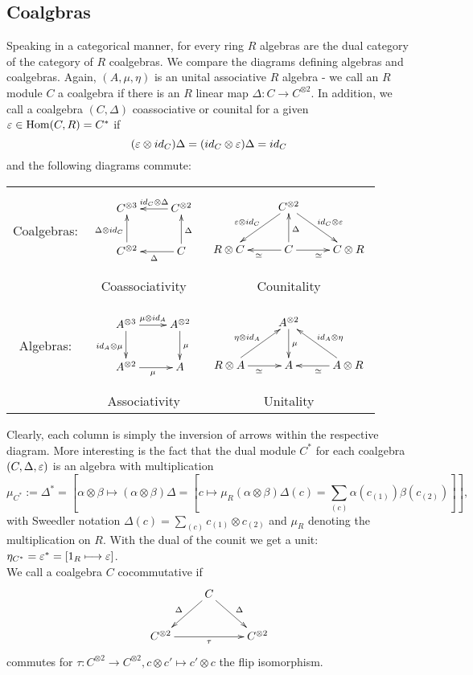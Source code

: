 \subsection{Coalgbras}
Speaking in a categorical manner, for every ring $R$ algebras are the dual category of the category of $R$ coalgebras. We compare the diagrams defining algebras and coalgebras. Again, $(A, \mu, \eta)$ is an unital associative $R$ algebra - we call an $R$ module $C$ a coalgebra if there is an $R$ linear map $\Delta : C \longrightarrow C^{\otimes2}$. In addition, we call a coalgebra $(C, \Delta)$ coassociative or counital for a given $\varepsilon \in \mathrm{Hom}(C,R) = C^\ast$ if 
$$(\varepsilon \otimes id_C) \Delta = (id_C \otimes \varepsilon) \Delta = id_C$$
and the following diagrams commute:
\begin{longtable}{|c|cc|}
\hline
Coalgebras: &$$
\xymatrix{
C^{\otimes 3}  & C^{\otimes 2}\ar[l]_{id_C \otimes \Delta}\\
C^{\otimes 2} \ar[u]^{\Delta \otimes id_C}&C\ar[l]^{\Delta} \ar[u]_{\Delta}\\
}$$
&$$
\xymatrix{
&C^{\otimes 2}\ar[ld]_{\eps \otimes id_C}\ar[rd]^{id_C \otimes \eps}&\\
R \otimes C  &C\ar[u]_\Delta\ar[r]_{\simeq}\ar[l]^\simeq&C \otimes R \\
}$$\\
&Coassociativity & Counitality\\
\hline
&&\\
Algebras: &$$
\xymatrix{
A^{\otimes 3} \ar[r]^{\mu \otimes id_A} \ar[d]_{id_A \otimes \mu} & A^{\otimes 2}\ar[d]^{\mu}\\
A^{\otimes 2} \ar[r]_{\mu} &A\\
}$$
&$$
\xymatrix{
&A^{\otimes 2}\ar[d]^\mu&\\
R \otimes A \ar[r]_{\simeq}\ar[ru]^{\eta \otimes id_A} &A&A \otimes R \ar[lu]_{id_A \otimes \eta}\ar[l]^\simeq\\
}$$\\
&Associativity & Unitality\\
\hline
\end{longtable}
Clearly, each column is simply the inversion of arrows within the respective diagram. More interesting is the fact that the dual module $C^\ast$ for each coalgebra $(C, \Delta, \varepsilon)$ is an algebra with multiplication
$$\mu_{C^\ast} := \Delta^\ast = \left[\alpha \otimes \beta \longmapsto (\alpha \otimes \beta) \Delta = \left[c \longmapsto \mu_R(\alpha \otimes \beta)\Delta(c) = \sum_{(c)} \alpha(c_{(1)}) \beta(c_{(2)})\right]\right],$$
with Sweedler notation $\Delta(c) = \sum_{(c)} c_{(1)} \otimes c_{(2)}$ and $\mu_R$ denoting the multiplication on $R$. With the dual of the counit we get a unit: $\eta_{C^\ast} = \varepsilon^\ast = [1_R \longmapsto \varepsilon]$.\\
We call a coalgebra $C$ cocommutative if
$$\xymatrix{
&C \ar[rd]^\Delta \ar[dl]_\Delta&\\
C^{\otimes2} \ar[rr]_\tau &&C^{\otimes2}\\
}$$
commutes for $\tau : C^{\otimes2} \longrightarrow C^{\otimes2}, c \otimes c' \longmapsto c' \otimes c$ the flip isomorphism.
